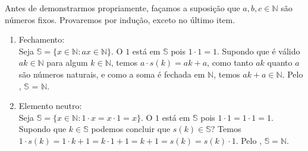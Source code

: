 \documentclass[../main.tex]{subfiles}
\begin{document}
\begin{dem}
    Antes de demonstrarmos propriamente, façamos a suposição que $a,b,c \in \mathbb{N}$ são números fixos. Provaremos por indução, exceto no último item.
    \begin{enumerate}[label=(\roman*)]
        \item Fechamento: \\
            Seja $\mathbb{S} = \{x \in \mathbb{N} : ax \in \mathbb{N} \}$.
            O $1$ está em $\mathbb{S}$ pois $1 \cdot 1 = 1$. Supondo que é válido $ak \in \mathbb{N}$ para algum $k \in \mathbb{N}$, temos $a \cdot s(k) = ak + a$, como tanto $ak$ quanto $a$ são números naturais, e como a soma é fechada em $\mathbb{N}$, temos $ak + a \in \mathbb{N}$. Pelo , $\mathbb{S}$ = $\mathbb{N}$. 
        \item Elemento neutro: \\
            Seja $\mathbb{S} = \{ x \in \mathbb{N} : 1 \cdot x = x \cdot 1  = x \}$. O $1$ está em $\mathbb{S}$ pois $1 \cdot 1 = 1 \cdot 1 = 1$. Supondo que $k \in \mathbb{S}$ podemos concluir que $s(k) \in \mathbb{S}$?
            Temos $1 \cdot s(k) = 1 \cdot k + 1 = k \cdot 1 + 1 = k + 1 = s(k) = s(k) \cdot 1$. Pelo , $\mathbb{S} = \mathbb{N}$.
            

\end{enumerate}
\end{dem}
\end{document}
